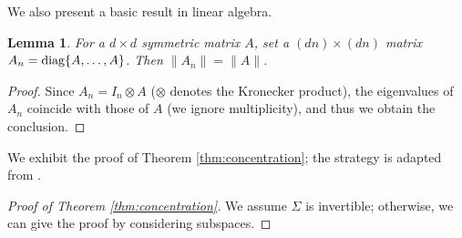 \documentclass[11pt,a4paper]{article}
\newtheorem{lemma}[theorem]{Lemma}
\theoremstyle{remark}
\theoremstyle{definition}
\newcommand{\bfA}{A}
\newcommand{\bfI}{I}
\newcommand{\bSigma}{\Sigma}
\newcommand{\diag}{\textnormal{diag}}
\theoremstyle{definition}
\begin{document}
\begin{bibunit}[apalike]
We also present a basic result in linear algebra.
\begin{lemma}\label{lem:norm}
    For a $d\times d$ symmetric matrix $\bfA$, set a $(dn)\times(dn)$ matrix $\bfA_{n}=\diag\{\bfA,\ldots,\bfA\}$. Then $\|\bfA_{n}\|= \|\bfA\|$.
\end{lemma}

\begin{proof}
    Since $\bfA_{n}=\bfI_{n}\otimes \bfA$ ($\otimes$ denotes the Kronecker product), the eigenvalues of $\bfA_{n}$ coincide with those of  $\bfA$ (we ignore multiplicity), and thus we obtain the conclusion.
\end{proof}

We exhibit the proof of Theorem \ref{thm:concentration}; the strategy is adapted from \citet{zhivotovskiy2024dimension}.
\begin{proof}[Proof of Theorem \ref{thm:concentration}]
    We assume $\bSigma$ is invertible; otherwise, we can give the proof by considering subspaces.


\end{proof}
\end{bibunit}
\end{document}
